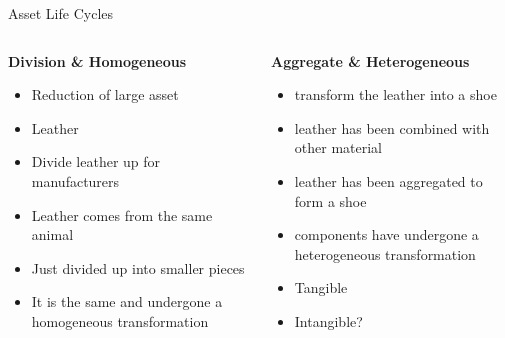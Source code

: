 \documentclass[pdf,table]{beamer}
\begin{document}
\begin{frame}{Asset Life Cycles}
	\begin{columns}[T]
		\begin{column}{0.48\textwidth}
			{\bf Division \& Homogeneous  }
			\begin{itemize}
				\item Reduction of large asset
				\item Leather 
				\item Divide leather up for manufacturers
				\item  Leather comes from the same animal 
				\item  Just divided up into smaller pieces
				\item It is the same and undergone a homogeneous transformation
			\end{itemize}
		\end{column}
		\begin{column}{0.48\textwidth}
			{\bf Aggregate \& Heterogeneous}
			\begin{itemize}
				\item transform the leather into a shoe 
				\item leather has been combined with other material
				\item leather has been aggregated to form a shoe
				\item components have undergone a heterogeneous transformation
				\item Tangible
				\item Intangible? %
			\end{itemize}
		\end{column}
	\end{columns}	
\end{frame}
\end{document}
